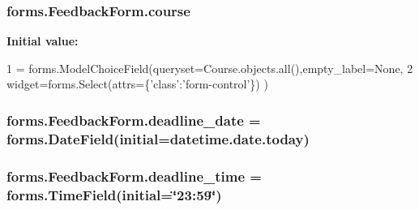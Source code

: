 \subsubsection[{\texorpdfstring{course}{course}}]{\setlength{\rightskip}{0pt plus 5cm}forms.\+Feedback\+Form.\+course\hspace{0.3cm}{\ttfamily [static]}}\hypertarget{classforms_1_1_feedback_form_ad2ca6f3b844aa3f80f8326428e83bacd}{}\label{classforms_1_1_feedback_form_ad2ca6f3b844aa3f80f8326428e83bacd}
{\bfseries Initial value\+:}
\begin{DoxyCode}
1 = forms.ModelChoiceField(queryset=Course.objects.all(),empty\_label=\textcolor{keywordtype}{None},
2                                                         widget=forms.Select(attrs=\{\textcolor{stringliteral}{'class'}:\textcolor{stringliteral}{'form-control'}\})
      )
\end{DoxyCode}
\subsubsection[{\texorpdfstring{deadline\+\_\+date}{deadline_date}}]{\setlength{\rightskip}{0pt plus 5cm}forms.\+Feedback\+Form.\+deadline\+\_\+date = forms.\+Date\+Field(initial=datetime.\+date.\+today)\hspace{0.3cm}{\ttfamily [static]}}\hypertarget{classforms_1_1_feedback_form_a5ccea176478e091bcaf31375ce6c53fa}{}\label{classforms_1_1_feedback_form_a5ccea176478e091bcaf31375ce6c53fa}
\subsubsection[{\texorpdfstring{deadline\+\_\+time}{deadline_time}}]{\setlength{\rightskip}{0pt plus 5cm}forms.\+Feedback\+Form.\+deadline\+\_\+time = forms.\+Time\+Field(initial=\char`\"{}23\+:59\char`\"{})\hspace{0.3cm}{\ttfamily [static]}}\hypertarget{classforms_1_1_feedback_form_aa0b66f54d93476e3eaf7ee49e33df1a4}{}\label{classforms_1_1_feedback_form_aa0b66f54d93476e3eaf7ee49e33df1a4}
